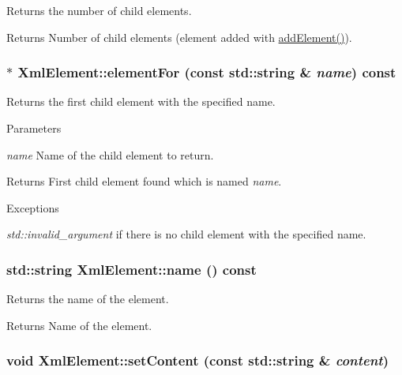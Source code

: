 Returns the number of child elements. 

\begin{DoxyReturn}{Returns}
Number of child elements (element added with \hyperlink{classXmlElement_a444321a1de2a7f52994c53f9e6e0d942}{addElement()}). 
\end{DoxyReturn}
\hypertarget{classXmlElement_a6babcb48cd31c025234ad35db5ebce3e}{
\subsubsection[{elementFor}]{ $\ast$ XmlElement::elementFor (const std::string \& {\em name}) const}}
\label{classXmlElement_a6babcb48cd31c025234ad35db5ebce3e}


Returns the first child element with the specified name. 


\begin{DoxyParams}{Parameters}
\item[{\em name}]Name of the child element to return. \end{DoxyParams}
\begin{DoxyReturn}{Returns}
First child element found which is named {\itshape name\/}. 
\end{DoxyReturn}

\begin{DoxyExceptions}{Exceptions}
\item[{\em std::invalid\_\-argument}]if there is no child element with the specified name. \end{DoxyExceptions}
\hypertarget{classXmlElement_a924c45bc90419123174ac9d11089cb6d}{
\subsubsection[{name}]{\setlength{\rightskip}{0pt plus 5cm}std::string XmlElement::name () const}}
\label{classXmlElement_a924c45bc90419123174ac9d11089cb6d}


Returns the name of the element. 

\begin{DoxyReturn}{Returns}
Name of the element. 
\end{DoxyReturn}
\hypertarget{classXmlElement_aaf32abf7cdaf31b8896f52a7859d9826}{
\subsubsection[{setContent}]{\setlength{\rightskip}{0pt plus 5cm}void XmlElement::setContent (const std::string \& {\em content})}}
\label{classXmlElement_aaf32abf7cdaf31b8896f52a7859d9826}



